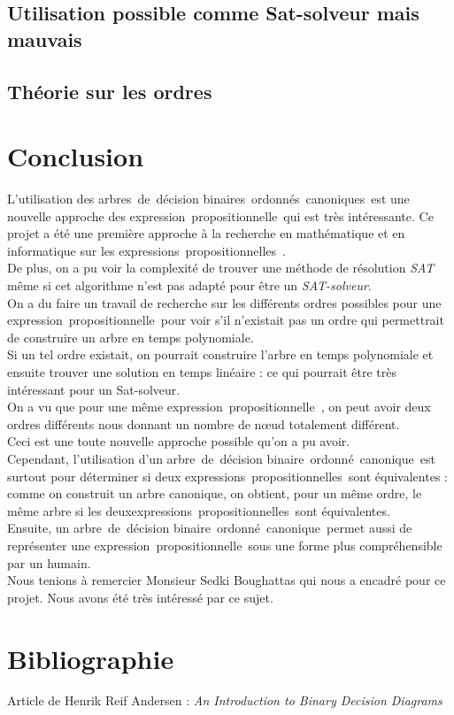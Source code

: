 \documentclass[a4paper, oneside]{report}
\newcommand{\adb}{arbre~de~décision binaire~}
\newcommand{\adbs}{arbres~de~décision binaires~}
\newcommand{\adbo}{\adb ordonné~}
\newcommand{\adbos}{\adbs ordonnés~}
\newcommand{\adboc}{\adbo canonique~}
\newcommand{\adbocs}{\adbos canoniques~}
\newcommand{\expp}{expression~propositionnelle~}
\newcommand{\expps}{expressions~propositionnelles~}
\begin{document}
\section{Utilisation possible comme Sat-solveur mais mauvais}
\section{Théorie sur les ordres}

\chapter*{Conclusion}
L'utilisation des \adbocs est une nouvelle approche des \expp qui est très intéressante. Ce projet a été une première approche à la recherche en mathématique et en informatique sur les \expps.\\
De plus, on a pu voir la complexité de trouver une méthode de résolution \textit{SAT} même si cet algorithme n'est pas adapté pour être un \textit{SAT-solveur}.\\
On a du faire un travail de recherche sur les différents ordres possibles pour une \expp pour voir s'il n'existait pas un ordre qui permettrait de construire un arbre en temps polynomiale.\\
Si un tel ordre existait, on pourrait construire l'arbre en temps polynomiale et ensuite trouver une solution en temps linéaire : ce qui pourrait être très intéressant pour un Sat-solveur.\\
On a vu que pour une même \expp, on peut avoir deux ordres différents nous donnant un nombre de nœud totalement différent.\\
Ceci est une toute nouvelle approche possible qu'on a pu avoir.\\
Cependant, l'utilisation d'un \adboc est surtout pour déterminer si deux \expps sont équivalentes : comme on construit un arbre canonique, on obtient, pour un même ordre, le même arbre si les deux\expps sont équivalentes.\\
Ensuite, un \adboc permet aussi de représenter une \expp sous une forme plus compréhensible par un humain.\\
Nous tenions à remercier Monsieur Sedki Boughattas qui nous a encadré pour ce projet. Nous avons été très intéressé par ce sujet.
\chapter*{Bibliographie}
Article de Henrik Reif Andersen : \textit{An Introduction to Binary Decision Diagrams}
\end{document}
